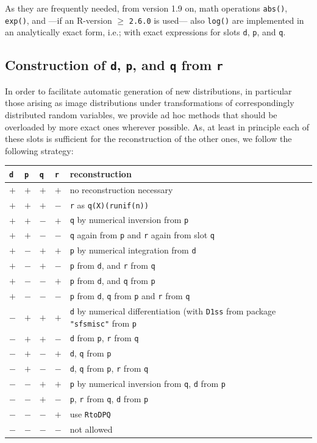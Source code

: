 \documentclass[11pt]{article}
\newcommand{\code}[1]{{\tt #1}}
\newcommand{\pkg}[1]{{\tt "#1"}}
\begin{document}
As they are frequently needed, from version 1.9 on, math operations
\code{abs()}, \code{exp()}, and ---if an {\sf R}-version $\ge$ {\tt 2.6.0} is
used--- also \code{log()} are implemented in an analytically exact form,
i.e.; with exact expressions for slots \code{d}, \code{p}, and \code{q}.

%
\subsection{Construction of \code{d}, \code{p}, and \code{q} from \code{r}}
%
In order to facilitate automatic generation of new distributions, in particular
those arising as image distributions under transformations of correspondingly
distributed random variables, we provide ad hoc methods that should be
overloaded by more exact ones wherever possible. As, at least in principle
each of these slots is sufficient for the reconstruction of the other ones,
we follow the following strategy:
\\
\begin{center}
\begin{tabular}{llll|p{10cm}}
\code{d} & \code{p} &  \code{q} & \code{r} & reconstruction\\
\hline
$+$&$+$&$+$&$+$&no reconstruction necessary\\
$+$&$+$&$+$&$-$&\code{r} as \code{q(X)(runif(n))}\\
$+$&$+$&$-$&$+$&\code{q} by numerical inversion from \code{p}\\
$+$&$+$&$-$&$-$&\code{q} again from \code{p} and
                         \code{r} again from slot \code{q}\\
$+$&$-$&$+$&$+$&\code{p} by numerical integration from \code{d}\\
$+$&$-$&$+$&$-$&\code{p} from \code{d}, and \code{r} from  \code{q}\\
$+$&$-$&$-$&$+$&\code{p} from \code{d}, and \code{q} from  \code{p}\\
$+$&$-$&$-$&$-$&\code{p} from \code{d},
\code{q} from \code{p} and \code{r} from  \code{q}\\
$-$&$+$&$+$&$+$&\code{d} by numerical differentiation (with \code{D1ss}
from package \pkg{sfsmisc} from \code{p}\\
$-$&$+$&$+$&$-$&\code{d} from \code{p}, \code{r} from \code{q}\\
$-$&$+$&$-$&$+$&\code{d}, \code{q}  from \code{p}\\
$-$&$+$&$-$&$-$&\code{d}, \code{q}  from \code{p}, \code{r} from \code{q}\\
$-$&$-$&$+$&$+$&\code{p} by numerical inversion from \code{q},
                \code{d} from \code{p}\\
$-$&$-$&$+$&$-$&\code{p}, \code{r} from \code{q}, \code{d} from \code{p}\\
$-$&$-$&$-$&$+$& use \code{RtoDPQ}\\
$-$&$-$&$-$&$-$&not allowed\\
\end{tabular}\\
\end{center}
\end{document}
